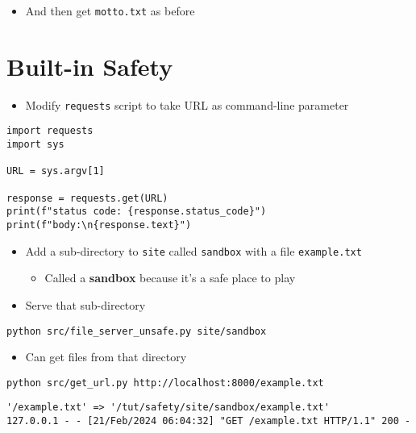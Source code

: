 \documentclass[krantzl]{krantz}
\newcommand{\glossref}[1]{\textbf{#1}}
\begin{document}
\begin{itemize}
\item And then get \texttt{motto.txt} as before

\end{itemize}
\section{Built-in Safety}
\begin{itemize}
\item Modify \texttt{requests} script to take URL as command-line parameter

\end{itemize}
\begin{lstlisting}[frame=tblr]
import requests
import sys

URL = sys.argv[1]

response = requests.get(URL)
print(f"status code: {response.status_code}")
print(f"body:\n{response.text}")
\end{lstlisting}

\begin{itemize}
\item Add a sub-directory to \texttt{site} called \texttt{sandbox} with a file \texttt{example.txt}\begin{itemize}
\item Called a \glossref{sandbox} because it’s a safe place to play

\end{itemize}


\item Serve that sub-directory

\end{itemize}
\begin{lstlisting}[frame=tblr]
python src/file_server_unsafe.py site/sandbox
\end{lstlisting}

\begin{itemize}
\item Can get files from that directory

\end{itemize}
\begin{lstlisting}[frame=tblr]
python src/get_url.py http://localhost:8000/example.txt
\end{lstlisting}

\begin{lstlisting}[frame=tblr,backgroundcolor=\color{black!5}]
'/example.txt' => '/tut/safety/site/sandbox/example.txt'
127.0.0.1 - - [21/Feb/2024 06:04:32] "GET /example.txt HTTP/1.1" 200 -
\end{lstlisting}
\end{document}
